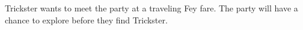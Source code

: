 Trickster wants to meet the party at a traveling Fey fare.
The party will have a chance to explore before they find Trickster.